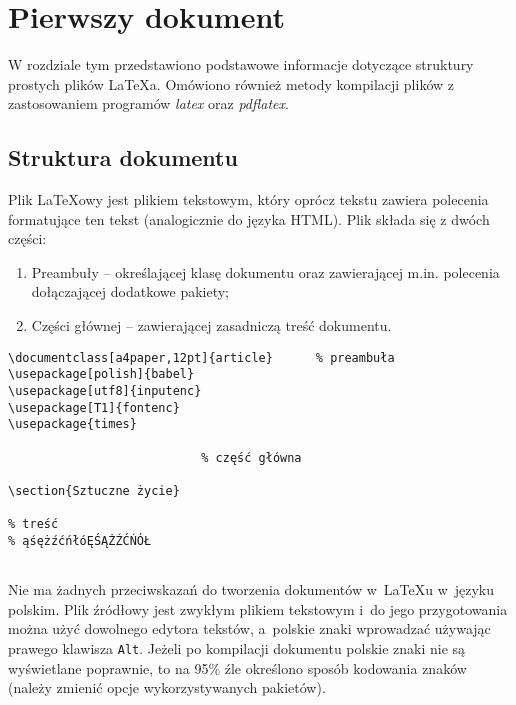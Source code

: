 \chapter{Pierwszy dokument}
\label{cha:pierwszyDokument}

W rozdziale tym przedstawiono podstawowe informacje dotyczące struktury prostych plików \LaTeX a. Omówiono również metody kompilacji plików z zastosowaniem programów \emph{latex} oraz \emph{pdflatex}.


\section{Struktura dokumentu}
\label{sec:strukturaDokumentu}

Plik \LaTeX owy jest plikiem tekstowym, który oprócz tekstu zawiera polecenia formatujące ten tekst (analogicznie do języka HTML). Plik składa się z dwóch części:
\begin{enumerate}%
\item Preambuły -- określającej klasę dokumentu oraz zawierającej m.in. polecenia dołączającej dodatkowe pakiety;

\item Części głównej -- zawierającej zasadniczą treść dokumentu.
\end{enumerate}


\begin{lstlisting}
\documentclass[a4paper,12pt]{article}      % preambuła
\usepackage[polish]{babel}
\usepackage[utf8]{inputenc}
\usepackage[T1]{fontenc}
\usepackage{times}

                           % część główna

\section{Sztuczne życie}

% treść
% ąśężźćńłóĘŚĄŻŹĆŃÓŁ


\end{lstlisting}

Nie ma żadnych przeciwskazań do tworzenia dokumentów w~\LaTeX u w~języku polskim. Plik źródłowy jest zwykłym plikiem tekstowym i~do jego przygotowania można użyć dowolnego edytora tekstów, a~polskie znaki wprowadzać używając prawego klawisza \texttt{Alt}. Jeżeli po kompilacji dokumentu polskie znaki nie są wyświetlane poprawnie, to na 95\% źle określono sposób kodowania znaków (należy zmienić opcje wykorzystywanych pakietów).


